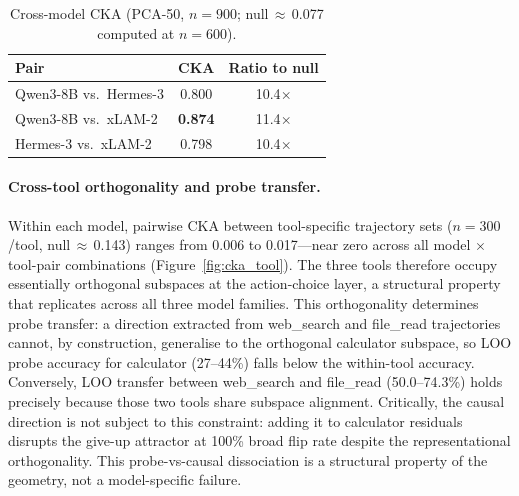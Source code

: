\documentclass{article}
\begin{document}
\begin{table}[h]
\caption{Cross-model CKA (PCA-50, $n{=}900$; null\,$\approx$\,0.077 computed at $n{=}600$).}
\label{tab:cka_model}
\centering\small
\begin{tabular}{lcc}
\toprule
Pair & CKA & Ratio to null \\
\midrule
Qwen3-8B vs.\ Hermes-3 & 0.800 & 10.4$\times$ \\
Qwen3-8B vs.\ xLAM-2   & \textbf{0.874} & 11.4$\times$ \\
Hermes-3 vs.\ xLAM-2   & 0.798 & 10.4$\times$ \\
\bottomrule
\end{tabular}
\end{table}

\paragraph{Cross-tool orthogonality and probe transfer.}
Within each model, pairwise CKA between tool-specific trajectory sets
($n{=}300$/tool, null\,$\approx$\,0.143) ranges from 0.006 to
0.017---near zero across all model $\times$ tool-pair combinations
(Figure~\ref{fig:cka_tool}).
The three tools therefore occupy essentially orthogonal subspaces at
the action-choice layer, a structural property that replicates across
all three model families.
This orthogonality determines probe transfer: a direction extracted
from web\_search and file\_read trajectories cannot, by construction,
generalise to the orthogonal calculator subspace, so LOO probe accuracy
for calculator (27--44\%) falls below the within-tool accuracy.
Conversely, LOO transfer between web\_search and file\_read (50.0--74.3\%)
holds precisely because those two tools share subspace alignment.
Critically, the causal direction is not subject to this constraint:
adding it to calculator residuals disrupts the give-up attractor at
100\% broad flip rate despite the representational orthogonality.
This probe-vs-causal dissociation is a structural property of the
geometry, not a model-specific failure.
\end{document}
